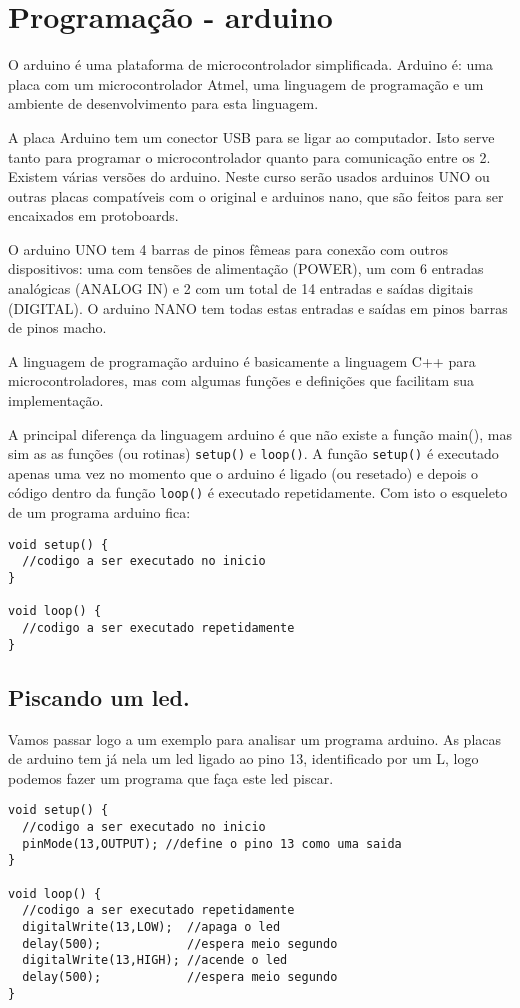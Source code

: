 \chapter{Programação - arduino}
O arduino é uma plataforma de microcontrolador simplificada. Arduino é: uma placa com um microcontrolador Atmel, uma linguagem de programação e um ambiente de desenvolvimento para esta linguagem.

A placa Arduino tem um conector USB para se ligar ao computador. Isto serve tanto para programar o microcontrolador quanto para comunicação entre os 2. Existem várias versões do arduino. Neste curso serão usados arduinos UNO ou outras placas compatíveis com o original e arduinos nano, que são feitos para ser encaixados em protoboards.

O arduino UNO tem 4 barras de pinos fêmeas para conexão com outros dispositivos: uma com tensões de alimentação (POWER), um com 6 entradas analógicas (ANALOG IN) e 2 com um total de 14 entradas e saídas digitais (DIGITAL). O arduino NANO tem todas estas entradas e saídas em pinos barras de pinos macho.

A linguagem de programação arduino é basicamente a linguagem C++ para microcontroladores, mas com algumas funções e definições que facilitam sua implementação.

A principal diferença da linguagem arduino é que não existe a função main(), mas sim as as funções (ou rotinas) \lstinline|setup()| e \lstinline|loop()|. A função \lstinline|setup()| é executado apenas uma vez no momento que o arduino é ligado (ou resetado) e depois o código dentro da função \lstinline|loop()| é executado repetidamente. Com isto o esqueleto de um programa arduino fica:

\begin{lstlisting}
void setup() {
  //codigo a ser executado no inicio
}

void loop() {
  //codigo a ser executado repetidamente
}
 \end{lstlisting}

\section{Piscando um led.}
Vamos passar logo a um exemplo para analisar um programa arduino. As placas de arduino tem já nela um led ligado ao pino 13, identificado por um L, logo podemos fazer um programa que faça este led piscar.
\begin{lstlisting}
void setup() {
  //codigo a ser executado no inicio
  pinMode(13,OUTPUT); //define o pino 13 como uma saida
}

void loop() {
  //codigo a ser executado repetidamente
  digitalWrite(13,LOW);  //apaga o led
  delay(500);            //espera meio segundo
  digitalWrite(13,HIGH); //acende o led
  delay(500);            //espera meio segundo
}	
\end{lstlisting}

